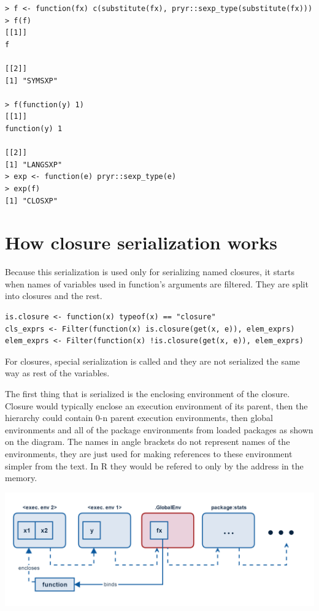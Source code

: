 \documentclass[thesis=B,english]{FITthesis}[2012/10/20]
\begin{document}
\begin{verbatim}
> f <- function(fx) c(substitute(fx), pryr::sexp_type(substitute(fx)))
> f(f)
[[1]]
f

[[2]]
[1] "SYMSXP"

> f(function(y) 1)
[[1]]
function(y) 1

[[2]]
[1] "LANGSXP"
> exp <- function(e) pryr::sexp_type(e)
> exp(f)
[1] "CLOSXP"
\end{verbatim}

\section{How closure serialization works}
Because this serialization is used only for serializing named closures, it starts when names of variables used in function’s arguments are filtered. They are split into closures and the rest.

\begin{verbatim}
is.closure <- function(x) typeof(x) == "closure"
cls_exprs <- Filter(function(x) is.closure(get(x, e)), elem_exprs)
elem_exprs <- Filter(function(x) !is.closure(get(x, e)), elem_exprs)
\end{verbatim}

For closures, special serialization is called and they are not serialized the same way as rest of the variables. 

The first thing that is serialized is the enclosing environment of the closure. Closure would typically enclose an execution environment of its parent, then the hierarchy could contain 0-n parent execution environments, then global environments and all of the package environments from loaded packages as shown on the diagram. The names in angle brackets do not represent names of the environments, they are just used for making references to these environment simpler from the text. In R they would be refered to only by the address in the memory. 

\includegraphics[width=\textwidth]{img/func-exec.png}
\end{document}
